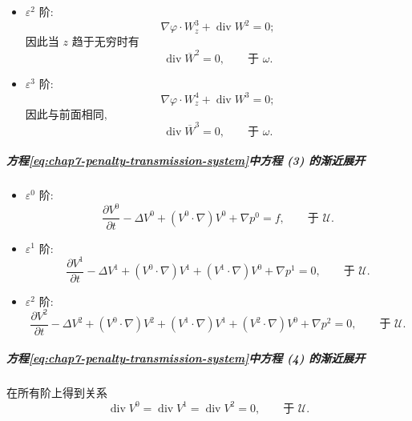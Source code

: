 \begin{sloppypar}
\begin{itemize}
\item $\varepsilon^2$ 阶:
\[
 \nabla\varphi\cdot W^3_z+\operatorname{div}W^2=0;
\]
因此当 $z$ 趋于无穷时有
\begin{equation}
 \operatorname{div}\overline W^2=0,\qquad\text{于 }\omega.
\label{eq:chap7-interior-W2-divergence}
\end{equation}

\item $\varepsilon^3$ 阶:
\[
 \nabla\varphi\cdot W^4_z+\operatorname{div}W^3=0;
\]
因此与前面相同,
\begin{equation}
 \operatorname{div}\overline W^3=0,\qquad\text{于 }\omega.
\label{eq:chap7-interior-W3-divergence}
\end{equation}
\end{itemize}

\subparagraph{方程\eqref{eq:chap7-penalty-transmission-system}中方程 (3) 的渐近展开}

\begin{itemize}
\item $\varepsilon^0$ 阶:
\begin{equation}
 \frac{\partial V^0}{\partial t}-\Delta V^0+(V^0\cdot\nabla)V^0+\nabla p^0=f,
 \qquad\text{于 }\mathcal U.
\label{eq:chap7-fluid-V0-equation}
\end{equation}

\item $\varepsilon^1$ 阶:
\begin{equation}
 \frac{\partial V^1}{\partial t}-\Delta V^1+(V^0\cdot\nabla)V^1
 +(V^1\cdot\nabla)V^0+\nabla p^1=0,
 \qquad\text{于 }\mathcal U.
\label{eq:chap7-fluid-V1-equation}
\end{equation}

\item $\varepsilon^2$ 阶:
\begin{equation}
 \frac{\partial V^2}{\partial t}-\Delta V^2+(V^0\cdot\nabla)V^2
 +(V^1\cdot\nabla)V^1+(V^2\cdot\nabla)V^0+\nabla p^2=0,
 \qquad\text{于 }\mathcal U.
\label{eq:chap7-fluid-V2-equation}
\end{equation}
\end{itemize}

\subparagraph{方程\eqref{eq:chap7-penalty-transmission-system}中方程 (4) 的渐近展开}

在所有阶上得到关系
\begin{equation}
 \operatorname{div}V^0=\operatorname{div}V^1=\operatorname{div}V^2=0,
 \qquad\text{于 }\mathcal U.
\label{eq:chap7-fluid-profile-divergence}
\end{equation}


\end{sloppypar}
